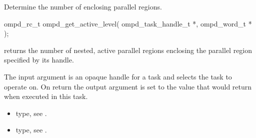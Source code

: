 \label{subsubsubsec:ompd_get_active_level}
\summary
Determine the number of enclosing  parallel regions.

\format
\begin{cspecific}
\begin{ompSyntax}
ompd_rc_t ompd_get_active_level(
  ompd_task_handle_t *,
  ompd_word_t *
);
\end{ompSyntax}
\end{cspecific}

\descr
{} returns the number of nested, active
parallel regions enclosing the parallel region specified by its handle.

\argdesc
The input argument  is an opaque handle for a task and selects the task to operate on.
On return the output argument  is set to the value that  would return when
executed in this task.

\crossreferences
\begin{itemize}
	\item {} type, see .
	\item {} type, see .
\end{itemize}

%
%
%



